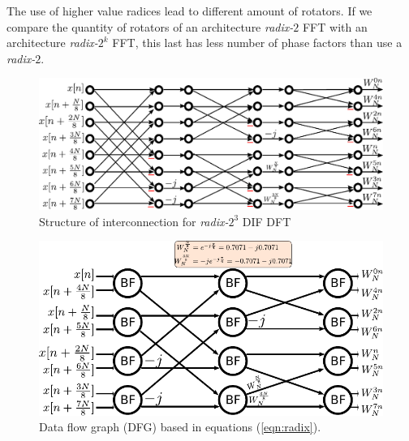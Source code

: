 \documentclass[journal,comsoc]{IEEEtran}
\begin{document}
The use of higher value radices lead to different amount of rotators. If we compare the quantity of rotators of an architecture \textit{radix-}$2$ FFT with an architecture \textit{radix-}$2^k$ FFT, this last has less number of phase factors than use a \textit{radix-}$2$.
\\

\begin{figure}[!t]
	\centering
	\includegraphics[width=\linewidth]{Diagramas/miSeccionFiguras/8PuntosRadix8Conexion.pdf}
	\caption{Structure of interconnection for \textit{radix-}$2^3$ DIF DFT}
	\label{fig:8puntosradix8conexion}
\end{figure}
\begin{figure}[t!]
	\centering
	\includegraphics[width=0.95\linewidth]{Diagramas/miSeccionFiguras/8PuntosRadix8Burbujas.pdf}
	\caption{Data flow graph (DFG) based in equations (\ref{eqn:radix}).}
	\label{fig:8puntosradix8burbujas}
\end{figure}
\end{document}
